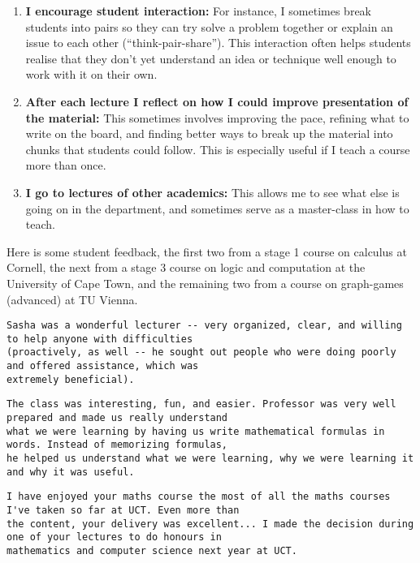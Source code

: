 \documentclass[a4paper,10pt]{scrartcl}
\begin{document}
\begin{enumerate}
 
 \item \textbf{I encourage student interaction:} For instance, I sometimes break students into pairs so they can try solve a problem together or explain an issue to each other (``think-pair-share''). This interaction often helps students realise that they don't yet understand an idea or technique well enough to work with it on their own. 
 
 
 \item \textbf{After each lecture I reflect on how I could improve presentation of the material:} This sometimes involves improving the pace, refining what to write on the board, and finding better ways to break up the material into chunks that students could follow. This is especially useful if I teach a course more than once.
 
 \item \textbf{I go to lectures of other academics:} This allows me to see what else is going on in the department, and sometimes serve as a master-class in how to teach.
 

\end{enumerate}

Here is some student feedback, the first two from a stage 1 course on calculus at Cornell, the next from a stage 3 course on logic and computation at 
the University of Cape Town, and the remaining two from a course on graph-games (advanced) at TU Vienna.
\noindent
\begin{verbatim}
Sasha was a wonderful lecturer -- very organized, clear, and willing to help anyone with difficulties 
(proactively, as well -- he sought out people who were doing poorly and offered assistance, which was 
extremely beneficial).
\end{verbatim}

\begin{verbatim}
The class was interesting, fun, and easier. Professor was very well prepared and made us really understand 
what we were learning by having us write mathematical formulas in words. Instead of memorizing formulas, 
he helped us understand what we were learning, why we were learning it and why it was useful. 
\end{verbatim}


\begin{verbatim}
I have enjoyed your maths course the most of all the maths courses I've taken so far at UCT. Even more than 
the content, your delivery was excellent... I made the decision during one of your lectures to do honours in 
mathematics and computer science next year at UCT. 
\end{verbatim}
\end{document}

